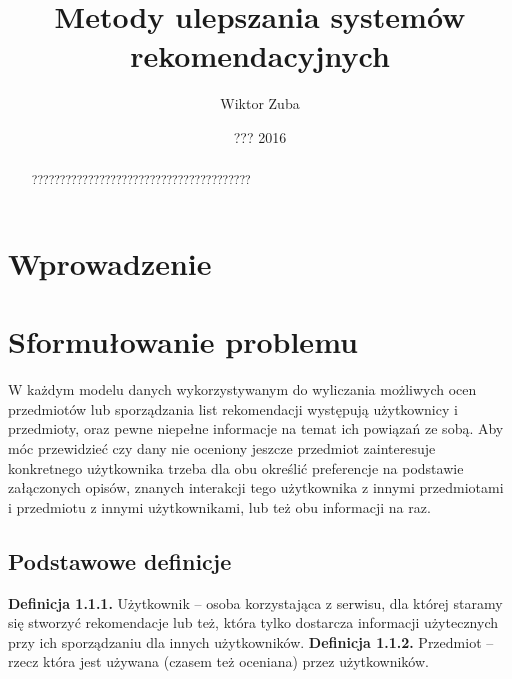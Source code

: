 \documentclass{pracamgr}
\author{Wiktor Zuba}
\title{Metody ulepszania systemów rekomendacyjnych}
\date{??? 2016}
\begin{document}
\maketitle

\begin{abstract}
???????????????????????????????????????
\end{abstract}


\tableofcontents

\chapter*{Wprowadzenie}

 \chapter{Sformułowanie problemu}
  W każdym modelu danych wykorzystywanym do wyliczania możliwych ocen przedmiotów lub sporządzania list rekomendacji
  występują użytkownicy i przedmioty, oraz pewne niepełne informacje na temat ich powiązań ze sobą.
  Aby móc przewidzieć czy dany nie oceniony jeszcze przedmiot zainteresuje konkretnego użytkownika trzeba dla obu określić preferencje na podstawie 
  załączonych opisów, znanych interakcji tego użytkownika z innymi przedmiotami i przedmiotu z innymi użytkownikami, lub też obu informacji na raz.
  
  
  \section{Podstawowe definicje}
   \textbf{Definicja 1.1.1.} Użytkownik -- osoba korzystająca z serwisu, dla której staramy się stworzyć rekomendacje lub też,
    która tylko dostarcza informacji użytecznych przy ich sporządzaniu dla innych użytkowników.\newline\newline
   \textbf{Definicja 1.1.2.} Przedmiot -- rzecz która jest używana (czasem też oceniana) przez użytkowników.\newline
   
\end{document}
